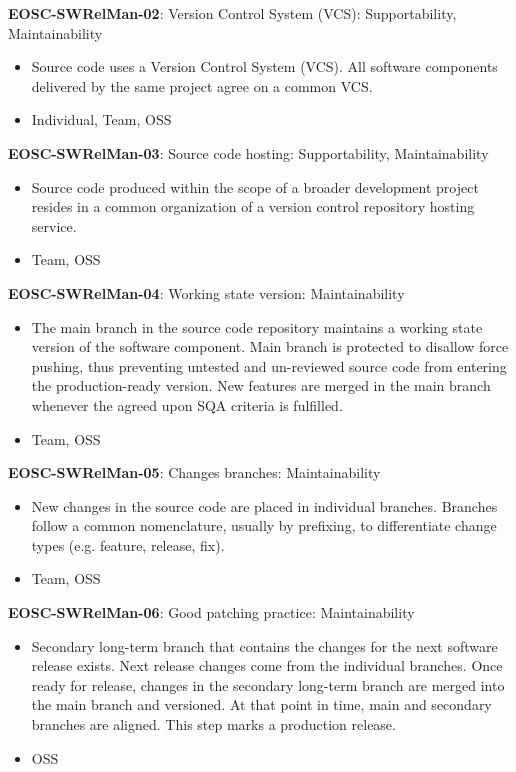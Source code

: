 \textbf{EOSC-SWRelMan-02}: Version Control System (VCS): Supportability, Maintainability

\begin{itemize}
    \item Source code uses a Version Control System (VCS). All software components delivered by the same project agree on a common VCS. \cite{orviz_set_2017}
    \item Individual, Team, OSS
\end{itemize}

\textbf{EOSC-SWRelMan-03}: Source code hosting: Supportability, Maintainability

\begin{itemize}
    \item Source code produced within the scope of a broader development project resides in a common organization of a version control repository hosting service. \cite{orviz_set_2017}
    \item Team, OSS
\end{itemize}

\textbf{EOSC-SWRelMan-04}: Working state version: Maintainability

\begin{itemize}
    \item The main branch in the source code repository maintains a working state version of the software component. Main branch is protected to disallow force pushing, thus preventing untested and un-reviewed source code from entering the production-ready version. New features are merged in the main branch whenever the agreed upon SQA criteria is fulfilled. \cite{orviz_set_2017}
    \item Team, OSS
\end{itemize}

\textbf{EOSC-SWRelMan-05}: Changes branches: Maintainability

\begin{itemize}
    \item New changes in the source code are placed in individual branches. Branches follow a common nomenclature, usually by prefixing, to differentiate change types (e.g. feature, release, fix). \cite{orviz_set_2017}
    \item Team, OSS
\end{itemize}

\textbf{EOSC-SWRelMan-06}: Good patching practice: Maintainability

\begin{itemize}
    \item Secondary long-term branch that contains the changes for the next software release exists. Next release changes come from the individual branches. Once ready for release, changes in the secondary long-term branch are merged into the main branch and versioned. At that point in time, main and secondary branches are aligned. This step marks a production release. \cite{orviz_set_2017,raymond_software_2013}
    \item OSS
\end{itemize}

